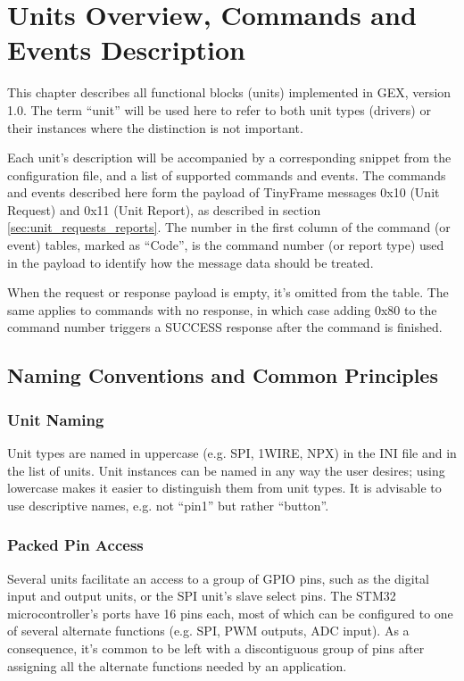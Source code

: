 \chapter{Units Overview, Commands and Events Description} \label{sec:units-overview}

This chapter describes all functional blocks (units) implemented in GEX, version 1.0. The term ``unit'' will be used here to refer to both unit types (drivers) or their instances where the distinction is not important.

Each unit's description will be accompanied by a corresponding snippet from the configuration file, and a list of supported commands and events. The commands and events described here form the payload of TinyFrame messages 0x10 (Unit Request) and 0x11 (Unit Report), as described in section \ref{sec:unit_requests_reports}. The number in the first column of the command (or event) tables, marked as ``Code'', is the command number (or report type) used in the payload to identify how the message data should be treated.

When the request or response payload is empty, it's omitted from the table. The same applies to commands with no response, in which case adding 0x80 to the command number triggers a SUCCESS response after the command is finished.

\section{Naming Conventions and Common Principles}

\subsection{Unit Naming}

Unit types are named in uppercase (e.g. SPI, 1WIRE, NPX) in the INI file and in the list of units. Unit instances can be named in any way the user desires; using lowercase makes it easier to distinguish them from unit types. It is advisable to use descriptive names, e.g. not ``pin1'' but rather ``button''.

\subsection{Packed Pin Access}

Several units facilitate an access to a group of GPIO pins, such as the digital input and output units, or the SPI unit's slave select pins. The STM32 microcontroller's ports have 16 pins each, most of which can be configured to one of several alternate functions (e.g. SPI, PWM outputs, ADC input). As a consequence, it's common to be left with a discontiguous group of pins after assigning all the alternate functions needed by an application.

